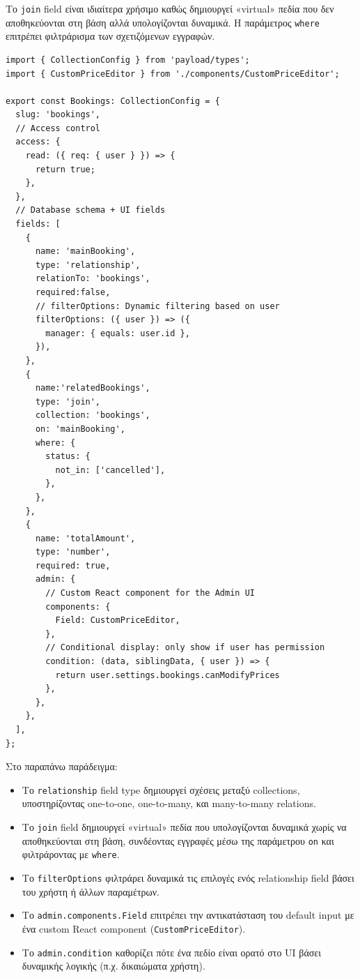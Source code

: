 \documentclass[
	12pt, %
	oneside, %
	greek,
	onehalfspacing, %
	liststotoc, %
	toctotoc, %
	parskip, %
	headsepline, %
]{MastersDoctoralThesis} %
\newcommand{\code}[1]{\texttt{#1}}
\begin{document}
Το \code{join} field είναι ιδιαίτερα χρήσιμο καθώς δημιουργεί «virtual» πεδία που δεν αποθηκεύονται στη βάση αλλά υπολογίζονται δυναμικά. Η παράμετρος \code{where} επιτρέπει φιλτράρισμα των σχετιζόμενων εγγραφών.

\newpage
\begin{lstlisting}[caption={Παράδειγμα CollectionConfig με custom components και conditional logic},basicstyle=\scriptsize\ttfamily,aboveskip=0pt,belowskip=0pt,lineskip=0pt]
import { CollectionConfig } from 'payload/types';
import { CustomPriceEditor } from './components/CustomPriceEditor';

export const Bookings: CollectionConfig = {
  slug: 'bookings',
  // Access control
  access: {
    read: ({ req: { user } }) => {
      return true;
    },
  },
  // Database schema + UI fields
  fields: [
    {
      name: 'mainBooking',
      type: 'relationship',
      relationTo: 'bookings',
      required:false,
      // filterOptions: Dynamic filtering based on user
      filterOptions: ({ user }) => ({
        manager: { equals: user.id },
      }),
    },
    {
      name:'relatedBookings',
      type: 'join',
      collection: 'bookings',
      on: 'mainBooking',
      where: {
        status: {
          not_in: ['cancelled'],
        },
      },
    },
    {
      name: 'totalAmount',
      type: 'number',
      required: true,
      admin: {
        // Custom React component for the Admin UI
        components: {
          Field: CustomPriceEditor,
        },
        // Conditional display: only show if user has permission
        condition: (data, siblingData, { user }) => {
          return user.settings.bookings.canModifyPrices
        },
      },
    },
  ],
};
\end{lstlisting}

\newpage
Στο παραπάνω παράδειγμα:

\begin{itemize}
    \item Το \code{relationship} field type δημιουργεί σχέσεις μεταξύ collections, υποστηρίζοντας one-to-one, one-to-many, και many-to-many relations.
    \item Το \code{join} field δημιουργεί «virtual» πεδία που υπολογίζονται δυναμικά χωρίς να αποθηκεύονται στη βάση, συνδέοντας εγγραφές μέσω της παράμετρου \code{on} και φιλτράροντας με \code{where}.
    \item Το \code{filterOptions} φιλτράρει δυναμικά τις επιλογές ενός relationship field βάσει του χρήστη ή άλλων παραμέτρων.
    \item Το \code{admin.components.Field} επιτρέπει την αντικατάσταση του default input με ένα custom React component (\code{CustomPriceEditor}).
    \item Το \code{admin.condition} καθορίζει πότε ένα πεδίο είναι ορατό στο UI βάσει δυναμικής λογικής (π.χ. δικαιώματα χρήστη).
\end{itemize}
\end{document}
